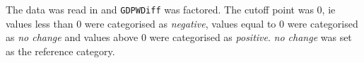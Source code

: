\documentclass[12pt,letterpaper]{article}
\begin{document}
  The data was read in and \texttt{GDPWDiff} was factored.  The cutoff point was 0, ie values less than 0 were categorised as \emph{negative}, values equal to 0 were categorised as \emph{no change} and values above 0 were categorised as \emph{positive}.  \emph{no change} was set as the reference category.
  

\end{document}
